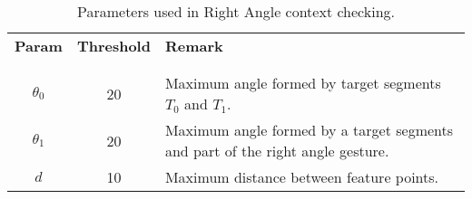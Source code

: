 \begin{table}
\centering
\begin{tabular}{c c p{8cm}}
\textbf{Param} & \textbf{Threshold} & \textbf{Remark} \\
\\
\hline
\\
$\theta_0$ &

20 & 

Maximum angle formed by target segments $T_0$ and $T_1$.

\\
$\theta_1$ &

20 & 

Maximum angle formed by a target segments and part of the right angle gesture.

\\

$d$ &

10 & 

Maximum distance between feature points.

\\


\end{tabular}
\caption{Parameters used in Right Angle context checking.}
\label{tab:right-angle-params}
\end{table}
